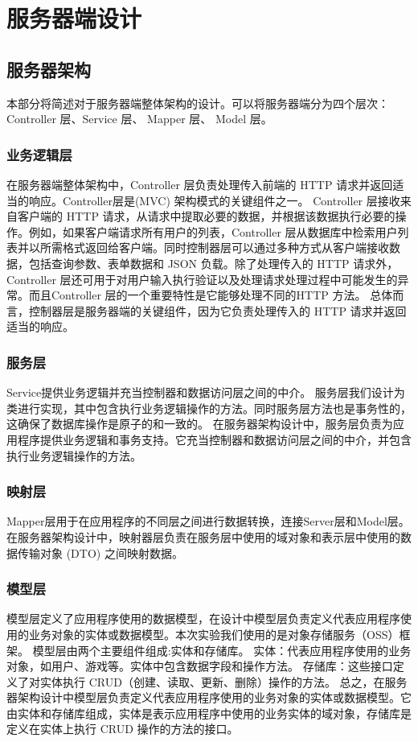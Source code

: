 \documentclass[12pt]{ctexart} %
\begin{document}
\section{服务器端设计}

\subsection{服务器架构}
本部分将简述对于服务器端整体架构的设计。可以将服务器端分为四个层次：Controller 层、Service 层、 Mapper 层、 Model 层。
\subsubsection{业务逻辑层}
在服务器端整体架构中，Controller 层负责处理传入前端的 HTTP 请求并返回适当的响应。Controller层是(MVC) 架构模式的关键组件之一。
Controller 层接收来自客户端的 HTTP 请求，从请求中提取必要的数据，并根据该数据执行必要的操作。例如，如果客户端请求所有用户的列表，Controller 层从数据库中检索用户列表并以所需格式返回给客户端。同时控制器层可以通过多种方式从客户端接收数据，包括查询参数、表单数据和 JSON 负载。除了处理传入的 HTTP 请求外，Controller 层还可用于对用户输入执行验证以及处理请求处理过程中可能发生的异常。而且Controller 层的一个重要特性是它能够处理不同的HTTP 方法。
总体而言，控制器层是服务器端的关键组件，因为它负责处理传入的 HTTP 请求并返回适当的响应。
\subsubsection{服务层}
Service提供业务逻辑并充当控制器和数据访问层之间的中介。
服务层我们设计为类进行实现，其中包含执行业务逻辑操作的方法。同时服务层方法也是事务性的，这确保了数据库操作是原子的和一致的。
在服务器架构设计中，服务层负责为应用程序提供业务逻辑和事务支持。它充当控制器和数据访问层之间的中介，并包含执行业务逻辑操作的方法。
\subsubsection{映射层}
Mapper层用于在应用程序的不同层之间进行数据转换，连接Server层和Model层。
在服务器架构设计中，映射器层负责在服务层中使用的域对象和表示层中使用的数据传输对象 (DTO) 之间映射数据。
\subsubsection{模型层}
模型层定义了应用程序使用的数据模型，在设计中模型层负责定义代表应用程序使用的业务对象的实体或数据模型。本次实验我们使用的是对象存储服务（OSS）框架。
模型层由两个主要组件组成:实体和存储库。
实体：代表应用程序使用的业务对象，如用户、游戏等。实体中包含数据字段和操作方法。
存储库：这些接口定义了对实体执行 CRUD（创建、读取、更新、删除）操作的方法。
总之，在服务器架构设计中模型层负责定义代表应用程序使用的业务对象的实体或数据模型。它由实体和存储库组成，实体是表示应用程序中使用的业务实体的域对象，存储库是定义在实体上执行 CRUD 操作的方法的接口。
\end{document}
